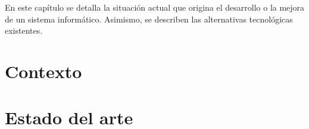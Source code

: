 En este capítulo se detalla la situación actual que origina el desarrollo o la mejora de un sistema informático. Asimismo, se describen las alternativas tecnológicas existentes.

\section{Contexto} 
\label{sec:context}


\section{Estado del arte}
\label{sec:stateoftheart}
